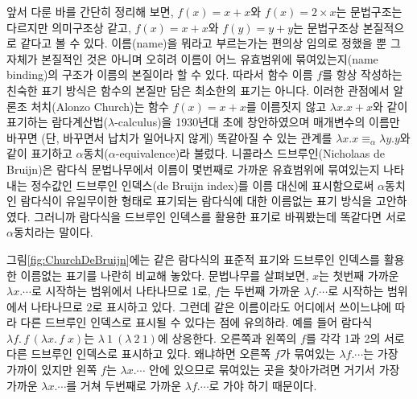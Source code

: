 앞서 다룬 바를 간단히 정리해 보면, $f(x) = x+x$와 $f(x) = 2\times x$는 문법구조는
다르지만 의미구조상 같고, $f(x) = x+x$와 $f(y) = y+y$는 문법구조상 본질적으로
같다고 볼 수 있다. 이름(name)을 뭐라고 부르는가는 편의상 임의로 정했을 뿐
그 자체가 본질적인 것은 아니며 오히려 이름이 어느 유효범위에
묶여있는지(name binding)의 구조가 이름의 본질이라 할 수 있다. 따라서
함수 이름 $f$를 항상 작성하는 친숙한 표기 방식은 함수의 본질만 담은
최소한의 표기는 아니다. 이러한 관점에서 알론조 처치(Alonzo Church)는
함수 $f(x) = x+x$를 이름짓지 않고 $\lambda x.x+x$와 같이 표기하는
%
%
람다계산법($\lambda$-calculus)을 1930년대 초에 창안\cite{Church1932}하였으며
매개변수의 이름만 바꾸면 (단, 바꾸면서 납치가 일어나지 않게) 똑같아질
수 있는 관계를 $\lambda x.x \equiv_\alpha \lambda y.y$와 같이 표기하고
%
%
%
%
$\alpha$동치($\alpha$-equivalence)라 불렀다.
니콜라스 드브루인(Nicholaas de Bruijn)은 람다식 문법나무에서 이름이 몇번째로
가까운 유효범위에 묶여있는지 나타내는 정수값인
%
%
드브루인 인덱스(de Bruijn index)를
이름 대신에 표시함으로써 $\alpha$동치인 람다식이 유일무이한 형태로 표기되는
람다식에 대한 이름없는 표기 방식\cite{deBruijn1972}을 고안하였다. 그러니까 람다식을
드브루인 인덱스를 활용한 표기로 바꿔봤는데 똑같다면 서로 $\alpha$동치라는 말이다.

그림\;\ref{fig:ChurchDeBruijn}에는 같은 람다식의 표준적 표기와
드브루인 인덱스를 활용한 이름없는 표기를 나란히 비교해 놓았다.
문법나무를 살펴보면,
$x$는 첫번째 가까운 $\lambda x.\cdots$로 시작하는 범위에서 나타나므로 1로,
$f$는 두번째 가까운 $\lambda f.\cdots$로 시작하는 범위에서 나타나므로 2로
표시하고 있다. 그런데 같은 이름이라도 어디에서 쓰이느냐에 따라 다른
드브루인 인덱스로 표시될 수 있다는 점에 유의하라. 예를 들어
람다식 $\lambda f.\,f\,(\lambda x.\,f\;x)$는 $\lambda~1~(\lambda~2~1)$에 상응한다.
오른쪽과 왼쪽의 $f$를 각각 1과 2의 서로 다른 드브루인 인덱스로 표시하고 있다.
왜냐하면 오른쪽 $f$가 묶여있는 $\lambda f.\cdots$는 가장 가까이 있지만
왼쪽 $f$는 $\lambda x.\cdots$ 안에 있으므로 묶여있는 곳을 찾아가려면
거기서 가장 가까운 $\lambda x.\cdots$를 거쳐 두번째로 가까운
$\lambda f.\cdots$로 가야 하기 때문이다.

